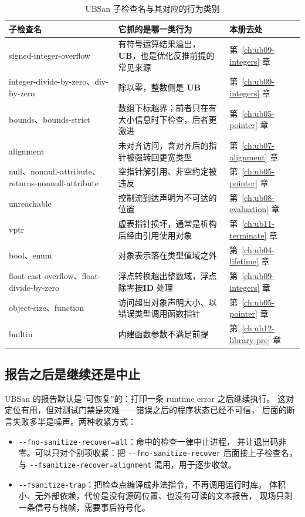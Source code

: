 \documentclass[12pt,a4paper,fontset=fandol]{ctexbook}
\newcommand{\Opt}[1]{\texttt{-\/-#1}}
\newcommand{\Bk}{\discretionary{}{}{}}
\newcommand{\UB}{\textbf{\textsf{UB}}}
\newcommand{\IDB}{\textbf{\textsf{ID}}}
\begin{document}
\begin{table}[htbp]
\centering
\caption{UBSan 子检查名与其对应的行为类别}\label{tab:ub03-ubsan-checks}
\begin{tabularx}{\textwidth}{@{}>{\raggedright\arraybackslash}p{} >{\raggedright\arraybackslash}X >{\raggedright\arraybackslash}p{}@{}}
\toprule
子检查名 & 它抓的是哪一类行为 & 本册去处 \\
\midrule
signed-integer-overflow & 有符号运算结果溢出，\UB{}，也是优化反推前提的常见来源 & 第~\ref{ch:ub09-integers} 章 \\
integer-divide-by-zero、div-by-zero & 除以零，整数侧是 \UB{} & 第~\ref{ch:ub09-integers} 章 \\
bounds、bounds-strict & 数组下标越界；前者只在有大小信息时下检查，后者更激进 & 第~\ref{ch:ub05-pointer} 章 \\
alignment & 未对齐访问，含对齐后的指针被强转回更宽类型 & 第~\ref{ch:ub07-alignment} 章 \\
null、nonnull-attribute、returns-nonnull-attribute & 空指针解引用、非空约定被违反 & 第~\ref{ch:ub05-pointer} 章 \\
unreachable & 控制流到达声明为不可达的位置 & 第~\ref{ch:ub08-evaluation} 章 \\
vptr & 虚表指针损坏，通常是析构后经由引用使用对象 & 第~\ref{ch:ub11-terminate} 章 \\
bool、enum & 对象表示落在类型值域之外 & 第~\ref{ch:ub04-lifetime} 章 \\
float-cast-overflow、float-divide-by-zero & 浮点转换越出整数域，浮点除零按\IDB{} 处理 & 第~\ref{ch:ub09-integers} 章 \\
object-size、function & 访问超出对象声明大小、以错误类型调用函数指针 & 第~\ref{ch:ub05-pointer} 章 \\
builtin & 内建函数参数不满足前提 & 第~\ref{ch:ub12-library-pre} 章 \\
\bottomrule
\end{tabularx}
\end{table}

\subsection{报告之后是继续还是中止}\label{sec:ub03-recover-trap}

UBSan 的报告默认是“可恢复”的：打印一条 runtime error 之后继续执行。
这对定位有用，但对测试门禁是灾难——错误之后的程序状态已经不可信，
后面的断言失败多半是噪声。两种收紧方式：

\begin{itemize}
\item \Opt{fno-sanitize-recover=all}：命中的检查一律中止进程，
      并让退出码非零。可以只对个别项收紧：把
      \Opt{fno{\Bk}-sanitize{\Bk}-recover} 后面接上子检查名，
      与 \Opt{fsanitize{\Bk}-recover=alignment} 混用，用于逐步收敛。
\item \Opt{fsanitize-trap}：把检查点编译成非法指令，不再调用运行时库。
      体积小、无外部依赖，代价是没有源码位置、也没有可读的文本报告，
      现场只剩一条信号与栈帧，需要事后符号化。
\end{itemize}
\end{document}
